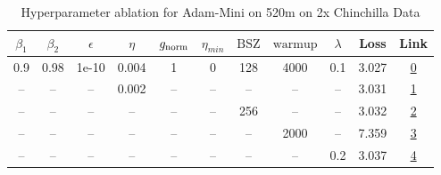 \begin{table}[H]
\centering
\caption{Hyperparameter ablation for Adam-Mini on 520m on 2x Chinchilla Data}
\label{tab:ablation_adam-mini_520m_on_2x_chinchilla_data}
\begin{tabular}{ccccccccccc}
\toprule
$\beta_1$ & $\beta_2$ & $\epsilon$ & $\eta$ & $g_{\mathrm{norm}}$ & $\eta_{min}$ & $\mathrm{BSZ}$ & $\mathrm{warmup}$ & $\lambda$ & Loss & Link \\
\midrule
0.9 & 0.98 & 1e-10 & 0.004 & 1 & 0 & 128 & 4000 & 0.1 & 3.027 & \href{https://wandb.ai/marin-community/optimizer-scaling/runs/sweep-520m-21B-mini4e584elr0.004-wd0.1-minlr0-warmup4000-b10.9-b-eceb71}{0} \\
\midrule
-- & -- & -- & 0.002 & -- & -- & -- & -- & -- & 3.031 & \href{https://wandb.ai/marin-community/optimizer-scaling/runs/sweep-520m-21B-mini3dba17lr0.002-wd0.1-minlr0-warmup4000-b10.9-b-557d40}{1} \\
-- & -- & -- & -- & -- & -- & 256 & -- & -- & 3.032 & \href{https://wandb.ai/marin-community/optimizer-scaling/runs/sweep-520m-21B-mini89512clr0.004-wd0.1-minlr0-warmup4000-b10.9-b-66cd27}{2} \\
-- & -- & -- & -- & -- & -- & -- & 2000 & -- & 7.359 & \href{https://wandb.ai/marin-community/optimizer-scaling/runs/sweep-520m-21B-mini5c5f85lr0.004-wd0.1-minlr0-warmup2000-b10.9-b-9ff993}{3} \\
-- & -- & -- & -- & -- & -- & -- & -- & 0.2 & 3.037 & \href{https://wandb.ai/marin-community/optimizer-scaling/runs/sweep-520m-21B-miniqbb0854lr0.004-wd0.2-minlr0-warmup4000-b10.9--8a1042}{4} \\
\bottomrule
\end{tabular}
\end{table}

